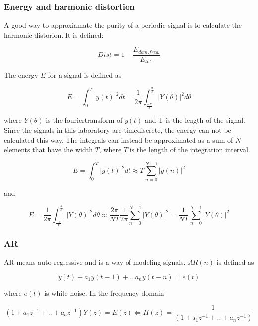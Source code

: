 \documentclass[12pt]{article}
\begin{document}
\subsubsection{Energy and harmonic distortion}
A good way to approxiamate the purity of a periodic signal is to calculate the harmonic distorion. It is defined:

\begin{equation}Dist = 1-\frac{E_{dom. freq.}}{E_{tot.}}\end{equation}

The energy $E$ for a signal is defined as

\begin{equation}E=\int_{0}^T \vert y(t)\vert ^2 dt=\frac{1}{2\pi}\int_{\frac{-\pi}{T}}^{\frac{\pi}{T}}\vert Y(\theta)\vert ^2d\theta \end{equation}

where $Y(\theta)$ is the fouriertransform of $y(t)$ and T is the length of the signal. Since the signals in this laboratory are timediscrete, the energy can not be calculated this way. The integrals can instead be approximated as a sum of $N$ elements that have the width $T$, where $T$ is the length of the integration interval.

\begin{equation}
E=\int_{0}^T \vert y(t)\vert^2 dt\approx T\sum_{n=0}^{N-1}\vert y(n) \vert^2 
\label{A} 
\end{equation}

and

\begin{equation}
E=\frac{1}{2\pi}\int_{\frac{-\pi}{T}}^{\frac{\pi}{T}}\vert Y(\theta)\vert ^2d\theta \approx \frac{2\pi}{NT}\frac{1}{2\pi}\sum_{n=0}^{N-1}\vert Y(\theta) \vert^2=\frac{1}{NT}\sum_{n=0}^{N-1}\vert Y(\theta) \vert^2 
\end{equation}

\subsubsection{AR}
\label{ar} 
AR means auto-regressive and is a way of modeling signals. $AR(n)$ is defined as

\begin{equation} 
y(t)+a_1y(t-1)+...a_ny(t-n)=e(t) 
\end{equation}

where $e(t)$ is white noise. In the frequency domain

\begin{equation}
\label{Hfreq}
(1+a_1z^{-1}+..+a_nz^{-1})Y(z)=E(z) \Leftrightarrow H(z) = \frac{1}{(1+a_1z^{-1}+..+a_nz^{-1})}
\end{equation}
\end{document}
